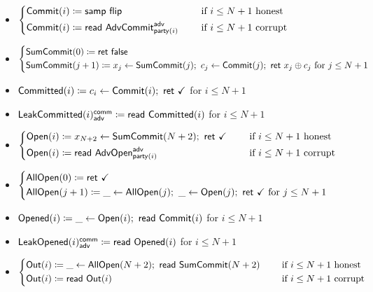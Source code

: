 \begin{itemize}
\item {\color{blue} $\begin{cases*} \Commit(i) \coloneqq \samp{\flip} & \hspace{10pt} \text{if $i \leq N+1$ honest} \\ \Commit(i) \coloneqq \read{\AdvCommit^\adv_{\party(i)}} & \hspace{10pt} \text{if $i \leq N+1$ corrupt} \end{cases*}$}
\item {\color{blue} $\begin{cases*} \SumCommit(0) \coloneqq \ret{\false} \\ \SumCommit(j+1) \coloneqq x_j \leftarrow \SumCommit(j); \ c_j \leftarrow \Commit(j); \ \ret{x_j \oplus c_j} \text{ for $j \leq N+1$} \end{cases*}$}
\item {\color{magenta} $\mathsf{Committed}(i) \coloneqq c_i \leftarrow \mathsf{Commit}(i); \ \mathsf{ret} \ \checkmark$ for $i \leq N+1$}
\item {\color{magenta} $\mathsf{LeakCommitted}(i)^{\mathsf{comm}}_{\mathsf{adv}} \coloneqq \mathsf{read} \ \mathsf{Committed}(i)$ for $i \leq N+1$}
\item {\color{teal} $\begin{cases*} \Open(i) \coloneqq x_{N+2} \leftarrow \SumCommit(N+2); \ \ret{\checkmark} & \hspace{10pt} \text{if $i \leq N+1$ honest} \\ \Open(i) \coloneqq \read{\AdvOpen^\adv_{\party(i)}} & \hspace{10pt} \text{if $i \leq N+1$ corrupt} \end{cases*}$}
\item {\color{teal} $\begin{cases*} \AllOpen(0) \coloneqq \ret{\checkmark} \\ \AllOpen(j+1) \coloneqq \_ \leftarrow \AllOpen(j); \ \_ \leftarrow \Open(j); \ \ret{\checkmark} \text{ for $j \leq N+1$} \end{cases*}$}
\item {\color{red} $\mathsf{Opened}(i) \coloneqq \_ \leftarrow \mathsf{Open}(i); \ \mathsf{read} \ \mathsf{Commit}(i)$ for $i \leq N+1$}
\item {\color{red} $\mathsf{LeakOpened}(i)^{\mathsf{comm}}_{\mathsf{adv}} \coloneqq \mathsf{read} \ \mathsf{Opened}(i)$ for $i \leq N+1$}
\item $\begin{cases*} \Out(i) \coloneqq \_ \leftarrow \AllOpen(N+2); \ \read{\SumCommit(N+2)} & \hspace{10pt} \text{if $i \leq N+1$ honest} \\ \Out(i) \coloneqq \read{\Out(i)} & \hspace{10pt} \text{if $i \leq N+1$ corrupt} \end{cases*}$
\end{itemize}

